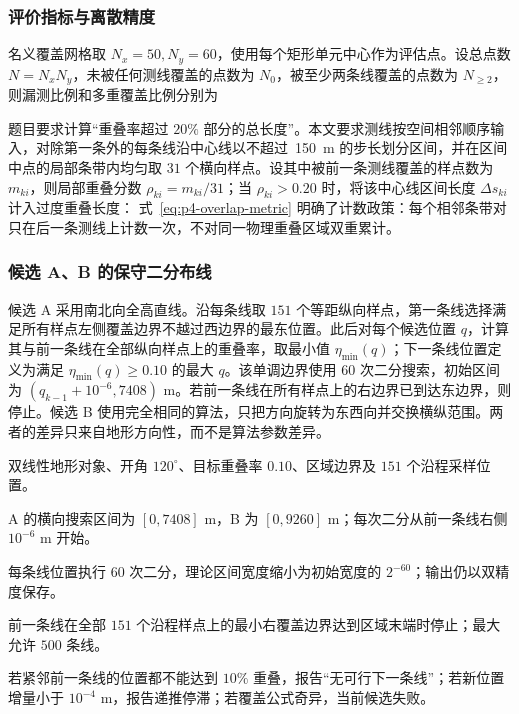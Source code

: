 \subsubsection{评价指标与离散精度}
名义覆盖网格取 $N_x=50,N_y=60$，使用每个矩形单元中心作为评估点。设总点数 $N=N_xN_y$，未被任何测线覆盖的点数为 $N_0$，被至少两条线覆盖的点数为 $N_{\ge2}$，则漏测比例和多重覆盖比例分别为

题目要求计算“重叠率超过 $20\%$ 部分的总长度”。本文要求测线按空间相邻顺序输入，对除第一条外的每条线沿中心线以不超过 \,\SI{150}{m} 的步长划分区间，并在区间中点的局部条带内均匀取 $31$ 个横向样点。设其中被前一条测线覆盖的样点数为 $m_{ki}$，则局部重叠分数 $\rho_{ki}=m_{ki}/31$；当 $\rho_{ki}>0.20$ 时，将该中心线区间长度 $\Delta s_{ki}$ 计入过度重叠长度：
式~\eqref{eq:p4-overlap-metric} 明确了计数政策：每个相邻条带对只在后一条测线上计数一次，不对同一物理重叠区域双重累计。

\subsubsection{候选 A、B 的保守二分布线}
候选 A 采用南北向全高直线。沿每条线取 $151$ 个等距纵向样点，第一条线选择满足所有样点左侧覆盖边界不越过西边界的最东位置。此后对每个候选位置 $q$，计算其与前一条线在全部纵向样点上的重叠率，取最小值 $\eta_{\min}(q)$；下一条线位置定义为满足 $\eta_{\min}(q)\ge0.10$ 的最大 $q$。该单调边界使用 $60$ 次二分搜索，初始区间为 $(q_{k-1}+10^{-6},7408)$ m。若前一条线在所有样点上的右边界已到达东边界，则停止。候选 B 使用完全相同的算法，只把方向旋转为东西向并交换横纵范围。两者的差异只来自地形方向性，而不是算法参数差异。

\begin{solvercontract}[保守直线候选的数值求解说明]
\item[输入] 双线性地形对象、开角 $120^\circ$、目标重叠率 $0.10$、区域边界及 $151$ 个沿程采样位置。
\item[搜索区间] A 的横向搜索区间为 $[0,7408]$ m，B 为 $[0,9260]$ m；每次二分从前一条线右侧 $10^{-6}$ m 开始。
\item[精度] 每条线位置执行 $60$ 次二分，理论区间宽度缩小为初始宽度的 $2^{-60}$；输出仍以双精度保存。
\item[停止条件] 前一条线在全部 $151$ 个沿程样点上的最小右覆盖边界达到区域末端时停止；最大允许 $500$ 条线。
\item[异常处理] 若紧邻前一条线的位置都不能达到 $10\%$ 重叠，报告“无可行下一条线”；若新位置增量小于 $10^{-4}$ m，报告递推停滞；若覆盖公式奇异，当前候选失败。
\end{solvercontract}

